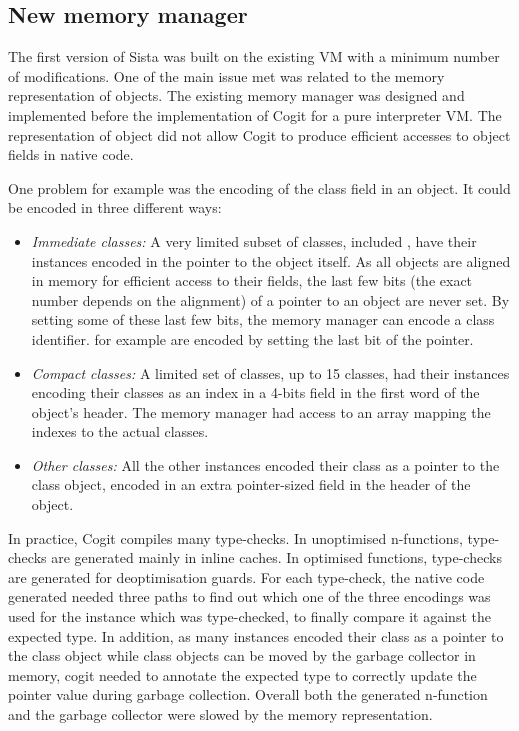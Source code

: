 \documentclass[a4paper,12pt,twoside]{../includes/ThesisStyle}
\begin{document}
\subsection{New memory manager}

The first version of Sista was built on the existing VM with a minimum number of modifications. One of the main issue met was related to the memory representation of objects. The existing memory manager was designed and implemented before the implementation of Cogit for a pure interpreter VM. The representation of object did not allow Cogit to produce efficient accesses to object fields in native code.

One problem for example was the encoding of the class field in an object. It could be encoded in three different ways:
\begin{itemize}
	\item \emph{Immediate classes:} A very limited subset of classes, included , have their instances encoded in the pointer to the object itself. As all objects are aligned in memory for efficient access to their fields, the last few bits (the exact number depends on the alignment) of a pointer to an object are never set. By setting some of these last few bits, the memory manager can encode a class identifier.  for example are encoded by setting the last bit of the pointer.
	\item \emph{Compact classes:} A limited set of classes, up to 15 classes, had their instances encoding their classes as an index in a 4-bits field in the first word of the object's header. The memory manager had access to an array mapping the indexes to the actual classes.
	\item \emph{Other classes:} All the other instances encoded their class as a pointer to the class object, encoded in an extra pointer-sized field in the header of the object.
\end{itemize}

In practice, Cogit compiles many type-checks. In unoptimised n-functions, type-checks are generated mainly in inline caches. In optimised functions, type-checks are generated for deoptimisation guards. For each type-check, the native code generated needed three paths to find out which one of the three encodings was used for the instance which was type-checked, to finally compare it against the expected type. In addition, as many instances encoded their class as a pointer to the class object while class objects can be moved by the garbage collector in memory, cogit needed to annotate the expected type to correctly update the pointer value during garbage collection. Overall both the generated n-function and the garbage collector were slowed by the memory representation.
\end{document}
